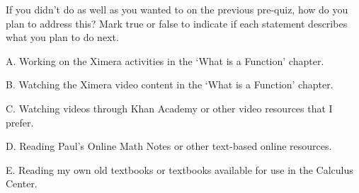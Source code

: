 \documentclass{ximera}
\begin{document}
\begin{question}

If you didn't do as well as you wanted to on the previous pre-quiz, how do you plan to address this?  Mark true or false to indicate if each statement describes what you plan to do next.

\vspace{1 in}

\begin{question}

    A. Working on the Ximera activities in the `What is a Function' chapter.

    \begin{multipleChoice}
    \end{multipleChoice}
    
\end{question}
\begin{question}
    
    B. Watching the Ximera video content in the `What is a Function' chapter. 
    
    \begin{multipleChoice}
    \end{multipleChoice}
    
\end{question}
\begin{question}
    
    C. Watching videos through Khan Academy or other video resources that I prefer.

    \begin{multipleChoice}
    \end{multipleChoice}
    
\end{question}
\begin{question}
    
    D. Reading Paul's Online Math Notes or other text-based online resources.

    \begin{multipleChoice}
    \end{multipleChoice}
    
\end{question}
\begin{question}
    
    E. Reading my own old textbooks or textbooks available for use in the Calculus Center.


\end{question}
\end{question}
\end{document}
